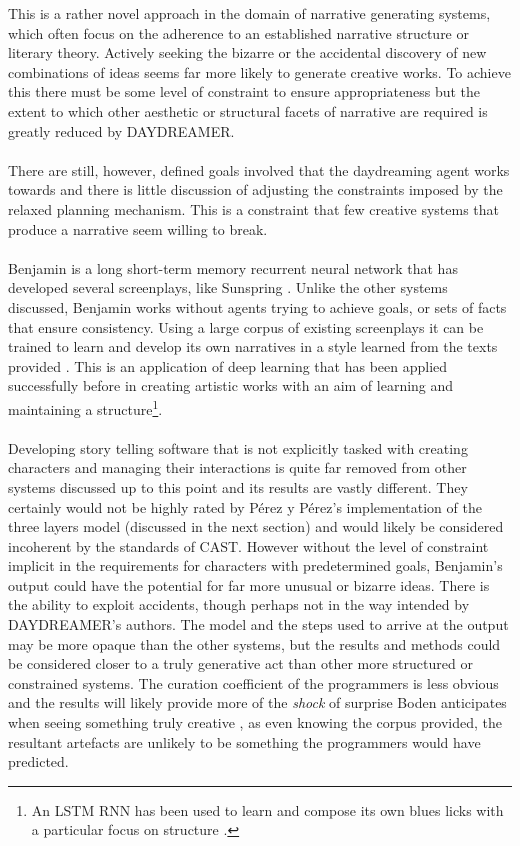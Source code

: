 \documentclass[letterpaper]{article}
\begin{document}
This is a rather novel approach in the domain of narrative generating systems, which often focus on the adherence to an established narrative structure or literary theory. Actively seeking the bizarre or the accidental discovery of new combinations of ideas seems far more likely to generate creative works. To achieve this there must be some level of constraint to ensure appropriateness but the extent to which other aesthetic or structural facets of narrative are required is greatly reduced by DAYDREAMER.\\
\\There are still, however, defined goals involved that the daydreaming agent works towards and there is little discussion of adjusting the constraints imposed by the relaxed planning mechanism. This is a constraint that few creative systems that produce a narrative seem willing to break.\\
\\Benjamin \cite{githubUniverseTalk} is a long short-term memory recurrent neural network that has developed several screenplays, like Sunspring \cite{SunspringScreenplay}. Unlike the other systems discussed, Benjamin works without agents trying to achieve goals, or sets of facts that ensure consistency. Using a large corpus of existing screenplays it can be trained to learn and develop its own narratives in a style learned from the texts provided \cite{githubUniverseTalk}. This is an application of deep learning that has been applied successfully before in creating artistic works with an aim of learning and maintaining a structure\footnote{An LSTM RNN has been used to learn and compose its own blues licks with a particular focus on structure \cite{Eck2002}.}.\\
\\Developing story telling software that is not explicitly tasked with creating characters and managing their interactions is quite far removed from other systems discussed up to this point and its results are vastly different. They certainly would not be highly rated by P\'erez y P\'erez's implementation of the three layers model (discussed in the next section) and would likely be considered incoherent by the standards of CAST. However without the level of constraint implicit in the requirements for characters with predetermined goals, Benjamin's output could have the potential for far more unusual or bizarre ideas. There is the ability to exploit accidents, though perhaps not in the way intended by DAYDREAMER's authors. The model and the steps used to arrive at the output may be more opaque than the other systems, but the results and methods could be considered closer to a truly generative act than other more structured or constrained systems. The curation coefficient of the programmers is less obvious and the results will likely provide more of the \emph{shock} of surprise Boden anticipates when seeing something truly creative \cite{BODEN1998347}, as even knowing the corpus provided, the resultant artefacts are unlikely to be something the programmers would have predicted.\\
\end{document}
